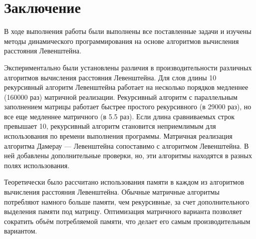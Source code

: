 \chapter{Заключение}

В ходе выполнения работы были выполнены все поставленные задачи и изучены методы динамического программирования на основе алгоритмов вычисления расстояния Левенштейна.

Экспериментально были установлены различия в производительности различных алгоритмов вычисления расстояния Левенштейна. Для слов длины 10 рекурсивный алгоритм Левенштейна работает на несколько порядков медленнее (160000 раз) матричной реализации. Рекурсивный алгоритм с параллельным заполнением матрицы работает быстрее простого рекурсивного (в 29000 раз), но все еще медленнее матричного (в 5.5 раз). Если длина сравниваемых строк превышает 10, рекурсивный алгоритм становится неприемлимым для использования по времени выполнения программы. Матричная реализация алгоритма Дамерау — Левенштейна сопоставимо с алгоритмом Левенштейна. В ней добавлены дополнительные проверки, но, эти алгоритмы находятся в разных полях использования.

Теоретически было рассчитано использования памяти в каждом из алгоритмов вычисления расстояния Левенштейна. Обычные матричные алгоритмы потребляют намного больше памяти, чем рекурсивные, за счет дополнительного выделения памяти под матрицу. Оптимизация матричного варианта позволяет сократить объём потребляемой памяти, что делает его самым производительным вариантом.